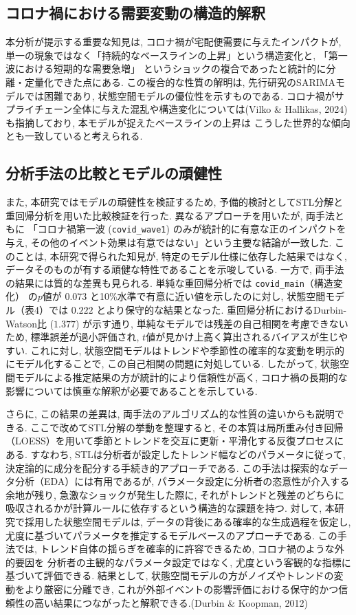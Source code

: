 \documentclass{bcsj}
\begin{document}
\subsection{コロナ禍における需要変動の構造的解釈}
本分析が提示する重要な知見は, コロナ禍が宅配便需要に与えたインパクトが, 
単一の現象ではなく「持続的なベースラインの上昇」という構造変化と, 「第一波における短期的な需要急増」
というショックの複合であったと統計的に分離・定量化できた点にある. この複合的な性質の解明は, 
先行研究のSARIMAモデルでは困難であり, 状態空間モデルの優位性を示すものである. 
コロナ禍がサプライチェーン全体に与えた混乱や構造変化については(Vilko \& Hallikas, 2024) も指摘しており, 本モデルが捉えたベースラインの上昇は
こうした世界的な傾向とも一致していると考えられる.

\subsection{分析手法の比較とモデルの頑健性}
また, 本研究ではモデルの頑健性を検証するため, 予備的検討としてSTL分解と重回帰分析を用いた比較検証を行った. 
異なるアプローチを用いたが, 両手法ともに
「コロナ禍第一波 (\texttt{covid\_wave1}) のみが統計的に有意な正のインパクトを与え, 
その他のイベント効果は有意ではない」という主要な結論が一致した. 
このことは, 本研究で得られた知見が, 特定のモデル仕様に依存した結果ではなく, データそのものが有する頑健な特性であることを示唆している. 
一方で, 両手法の結果には質的な差異も見られる. 
単純な重回帰分析では \texttt{covid\_main}（構造変化）
の$p$値が $0.073$ と10\%水準で有意に近い値を示したのに対し, 
状態空間モデル（表4）では $0.222$ とより保守的な結果となった. 
重回帰分析におけるDurbin-Watson比 ($1.377$) が示す通り, 単純なモデルでは残差の自己相関を考慮できないため, 
標準誤差が過小評価され, $t$値が見かけ上高く算出されるバイアスが生じやすい. 
これに対し, 状態空間モデルはトレンドや季節性の確率的な変動を明示的にモデル化することで, この自己相関の問題に対処している. 
したがって, 状態空間モデルによる推定結果の方が統計的により信頼性が高く, コロナ禍の長期的な影響については慎重な解釈が必要であることを示している. 

さらに, この結果の差異は, 両手法のアルゴリズム的な性質の違いからも説明できる. 
ここで改めてSTL分解の挙動を整理すると, その本質は局所重み付き回帰（LOESS）を用いて季節とトレンドを交互に更新・平滑化する反復プロセスにある. 
すなわち, STLは分析者が設定したトレンド幅などのパラメータに従って, 決定論的に成分を配分する手続き的アプローチである. 
この手法は探索的なデータ分析（EDA）には有用であるが, パラメータ設定に分析者の恣意性が介入する余地が残り, 
急激なショックが発生した際に, それがトレンドと残差のどちらに吸収されるかが計算ルールに依存するという構造的な課題を持つ. 
対して, 本研究で採用した状態空間モデルは, データの背後にある確率的な生成過程を仮定し, 
尤度に基づいてパラメータを推定するモデルベースのアプローチである. 
この手法では, トレンド自体の揺らぎを確率的に許容できるため, コロナ禍のような外的要因を
分析者の主観的なパラメータ設定ではなく, 尤度という客観的な指標に基づいて評価できる. 
結果として, 状態空間モデルの方がノイズやトレンドの変動をより厳密に分離でき, 
これが外部イベントの影響評価における保守的かつ信頼性の高い結果につながったと解釈できる.(Durbin \& Koopman, 2012)
\end{document}
